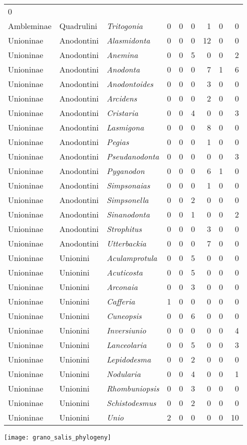 \documentclass[11pt]{article}
\begin{document}
\begin{longtable}[l]{@{}lllrrrrrr@{}}
0\tabularnewline
Ambleminae & Quadrulini & \textit{Tritogonia} & 0 & 0 & 0 & 1 & 0 &
0\tabularnewline
Unioninae & Anodontini & \textit{Alasmidonta} & 0 & 0 & 0 & 12 & 0 &
0\tabularnewline
Unioninae & Anodontini & \textit{Anemina} & 0 & 0 & 5 & 0 & 0 &
2\tabularnewline
Unioninae & Anodontini & \textit{Anodonta} & 0 & 0 & 0 & 7 & 1 &
6\tabularnewline
Unioninae & Anodontini & \textit{Anodontoides} & 0 & 0 & 0 & 3 & 0 &
0\tabularnewline
Unioninae & Anodontini & \textit{Arcidens} & 0 & 0 & 0 & 2 & 0 &
0\tabularnewline
Unioninae & Anodontini & \textit{Cristaria} & 0 & 0 & 4 & 0 & 0 &
3\tabularnewline
Unioninae & Anodontini & \textit{Lasmigona} & 0 & 0 & 0 & 8 & 0 &
0\tabularnewline
Unioninae & Anodontini & \textit{Pegias} & 0 & 0 & 0 & 1 & 0 &
0\tabularnewline
Unioninae & Anodontini & \textit{Pseudanodonta} & 0 & 0 & 0 & 0 & 0 &
3\tabularnewline
Unioninae & Anodontini & \textit{Pyganodon} & 0 & 0 & 0 & 6 & 1 &
0\tabularnewline
Unioninae & Anodontini & \textit{Simpsonaias} & 0 & 0 & 0 & 1 & 0 &
0\tabularnewline
Unioninae & Anodontini & \textit{Simpsonella} & 0 & 0 & 2 & 0 & 0 &
0\tabularnewline
Unioninae & Anodontini & \textit{Sinanodonta} & 0 & 0 & 1 & 0 & 0 &
2\tabularnewline
Unioninae & Anodontini & \textit{Strophitus} & 0 & 0 & 0 & 3 & 0 &
0\tabularnewline
Unioninae & Anodontini & \textit{Utterbackia} & 0 & 0 & 0 & 7 & 0 &
0\tabularnewline
Unioninae & Unionini & \textit{Aculamprotula} & 0 & 0 & 5 & 0 & 0 &
0\tabularnewline
Unioninae & Unionini & \textit{Acuticosta} & 0 & 0 & 5 & 0 & 0 &
0\tabularnewline
Unioninae & Unionini & \textit{Arconaia} & 0 & 0 & 3 & 0 & 0 &
0\tabularnewline
Unioninae & Unionini & \textit{Cafferia} & 1 & 0 & 0 & 0 & 0 &
0\tabularnewline
Unioninae & Unionini & \textit{Cuneopsis} & 0 & 0 & 6 & 0 & 0 &
0\tabularnewline
Unioninae & Unionini & \textit{Inversiunio} & 0 & 0 & 0 & 0 & 0 &
4\tabularnewline
Unioninae & Unionini & \textit{Lanceolaria} & 0 & 0 & 5 & 0 & 0 &
3\tabularnewline
Unioninae & Unionini & \textit{Lepidodesma} & 0 & 0 & 2 & 0 & 0 &
0\tabularnewline
Unioninae & Unionini & \textit{Nodularia} & 0 & 0 & 4 & 0 & 0 &
1\tabularnewline
Unioninae & Unionini & \textit{Rhombuniopsis} & 0 & 0 & 3 & 0 & 0 &
0\tabularnewline
Unioninae & Unionini & \textit{Schistodesmus} & 0 & 0 & 2 & 0 & 0 &
0\tabularnewline
Unioninae & Unionini & \textit{Unio} & 2 & 0 & 0 & 0 & 0 &
10\tabularnewline
\bottomrule
\end{longtable}

\newpage

\centering
	\texttt{[image: grano\_salis\_phylogeny]}
\end{document}

